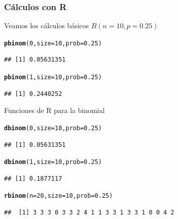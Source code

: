 \documentclass[handout]{beamer}\usepackage[]{graphicx}\usepackage[]{color}
\makeatletter
\newcommand{\hlnum}[1]{\textcolor[rgb]{0.686,0.059,0.569}{#1}}%
\newcommand{\hlstd}[1]{\textcolor[rgb]{0.345,0.345,0.345}{#1}}%
\newcommand{\hlkwc}[1]{\textcolor[rgb]{0.333,0.667,0.333}{#1}}%
\newcommand{\hlkwd}[1]{\textcolor[rgb]{0.737,0.353,0.396}{\textbf{#1}}}%
\newenvironment{kframe}{%
 \def\at@end@of@kframe{}%
 \ifinner\ifhmode%
  \def\at@end@of@kframe{\end{minipage}}%
  \begin{minipage}{\columnwidth}%
 \fi\fi%
 \def\FrameCommand##1{\hskip\@totalleftmargin \hskip-\fboxsep
 \colorbox{shadecolor}{##1}\hskip-\fboxsep
     \hskip-\linewidth \hskip-\@totalleftmargin \hskip\columnwidth}%
 \MakeFramed {\advance\hsize-\width
   \@totalleftmargin\z@ \linewidth\hsize
   \@setminipage}}%
 {\par\unskip\endMakeFramed%
 \at@end@of@kframe}
\newenvironment{knitrout}{}{} %
\theoremstyle{plain}
\theoremstyle{definition}
\makeatother
\begin{document}
\begin{frame}[fragile]
\frametitle{Cálculos con R}
Veamos los cálculos básicos $B(n=10,p=0.25)$

\begin{knitrout}
\color{fgcolor}\begin{kframe}
\begin{alltt}
\hlkwd{pbinom}\hlstd{(}\hlnum{0}\hlstd{,}\hlkwc{size}\hlstd{=}\hlnum{10}\hlstd{,}\hlkwc{prob}\hlstd{=}\hlnum{0.25}\hlstd{)}
\end{alltt}
\begin{verbatim}
## [1] 0.05631351
\end{verbatim}
\begin{alltt}
\hlkwd{pbinom}\hlstd{(}\hlnum{1}\hlstd{,}\hlkwc{size}\hlstd{=}\hlnum{10}\hlstd{,}\hlkwc{prob}\hlstd{=}\hlnum{0.25}\hlstd{)}
\end{alltt}
\begin{verbatim}
## [1] 0.2440252
\end{verbatim}
\end{kframe}
\end{knitrout}

\end{frame}

\begin{frame}[fragile]
Funciones de R para la binomial 

\begin{knitrout}
\color{fgcolor}\begin{kframe}
\begin{alltt}
\hlkwd{dbinom}\hlstd{(}\hlnum{0}\hlstd{,}\hlkwc{size}\hlstd{=}\hlnum{10}\hlstd{,}\hlkwc{prob}\hlstd{=}\hlnum{0.25}\hlstd{)}
\end{alltt}
\begin{verbatim}
## [1] 0.05631351
\end{verbatim}
\begin{alltt}
\hlkwd{dbinom}\hlstd{(}\hlnum{1}\hlstd{,}\hlkwc{size}\hlstd{=}\hlnum{10}\hlstd{,}\hlkwc{prob}\hlstd{=}\hlnum{0.25}\hlstd{)}
\end{alltt}
\begin{verbatim}
## [1] 0.1877117
\end{verbatim}
\begin{alltt}
\hlkwd{rbinom}\hlstd{(}\hlkwc{n}\hlstd{=}\hlnum{20}\hlstd{,}\hlkwc{size} \hlstd{=} \hlnum{10}\hlstd{,}\hlkwc{prob}\hlstd{=}\hlnum{0.25}\hlstd{)}
\end{alltt}
\begin{verbatim}
##  [1] 3 3 3 0 3 3 2 4 1 1 3 3 1 3 3 1 0 0 4 2
\end{verbatim}
\end{kframe}
\end{knitrout}

\end{frame}
\end{document}
